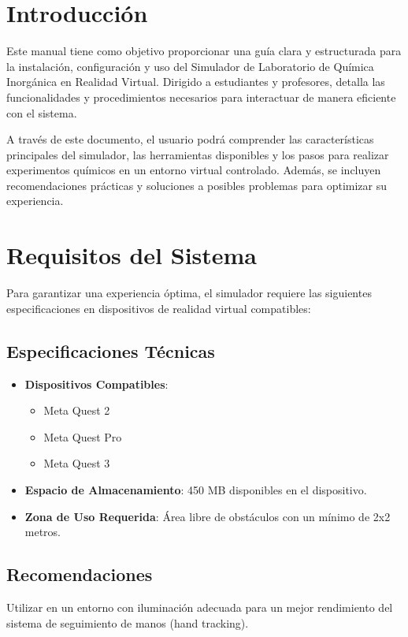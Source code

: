 \pagestyle{plain}
\section*{Introducción}
Este manual tiene como objetivo proporcionar una guía clara y estructurada para la instalación, configuración y uso del Simulador de Laboratorio de Química Inorgánica en Realidad Virtual. Dirigido a estudiantes y profesores, detalla las funcionalidades y procedimientos necesarios para interactuar de manera eficiente con el sistema.

A través de este documento, el usuario podrá comprender las características principales del simulador, las herramientas disponibles y los pasos para realizar experimentos químicos en un entorno virtual controlado. Además, se incluyen recomendaciones prácticas y soluciones a posibles problemas para optimizar su experiencia.

\section{Requisitos del Sistema}
Para garantizar una experiencia óptima, el simulador requiere las siguientes especificaciones en dispositivos de realidad virtual compatibles:

\subsection{Especificaciones Técnicas}
\begin{itemize}
    \item \textbf{Dispositivos Compatibles}:
    \begin{itemize}
        \item Meta Quest 2
        \item Meta Quest Pro
        \item Meta Quest 3
    \end{itemize}
    \item \textbf{Espacio de Almacenamiento}: 450 MB disponibles en el dispositivo.
    \item \textbf{Zona de Uso Requerida}: Área libre de obstáculos con un mínimo de 2x2 metros.
\end{itemize}

\subsection{Recomendaciones}
Utilizar en un entorno con iluminación adecuada para un mejor rendimiento del sistema de seguimiento de manos (hand tracking).
\newpage
